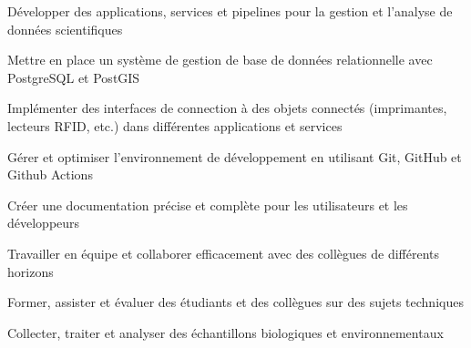 

\begin{cvskills}

  \begin{minipage}[t]{0.45\textwidth}
    \cvskill
      {Développer des applications, services et pipelines pour la gestion et l'analyse de données scientifiques}
  \end{minipage}\hfill
  \begin{minipage}[t]{0.45\textwidth}
    \cvskill
      {Mettre en place un système de gestion de base de données relationnelle avec PostgreSQL et PostGIS}
  \end{minipage}

  \begin{minipage}[t]{0.45\textwidth}
    \cvskill
      {Implémenter des interfaces de connection à des objets connectés (imprimantes, lecteurs RFID, etc.) dans différentes applications et services}
  \end{minipage}\hfill
  \begin{minipage}[t]{0.45\textwidth}
    \cvskill
      {Gérer et optimiser l'environnement de développement en utilisant Git, GitHub et Github Actions}
  \end{minipage}

  \begin{minipage}[t]{0.45\textwidth}
    \cvskill
      {Créer une documentation précise et complète pour les utilisateurs et les développeurs}
  \end{minipage}\hfill
  \begin{minipage}[t]{0.45\textwidth}
    \cvskill
      {Travailler en équipe et collaborer efficacement avec des collègues de différents horizons}
  \end{minipage}

  \begin{minipage}[t]{0.45\textwidth}
    \cvskill
      {Former, assister et évaluer des étudiants et des collègues sur des sujets techniques}
  \end{minipage}\hfill
  \begin{minipage}[t]{0.45\textwidth}
    \cvskill
      {Collecter, traiter et analyser des échantillons biologiques et environnementaux}
  \end{minipage}

\end{cvskills}